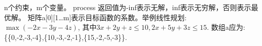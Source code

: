 n个约束，m个变量。
process 返回值为-inf表示无解，inf表示无穷解，否则表示最优解。
矩阵a[0][1\dots m]表示目标函数的系数。举例线性规划: 
$\max(-2x -3y - 4z)$, 其中$3x + 2y + z \le 10, 2x + 5y + 3z \le 15$. 数组a应为: \{\{0,-2,-3,-4\},\{10,-3,-2,-1\},\{15,-2,-5,-3\}\}.

